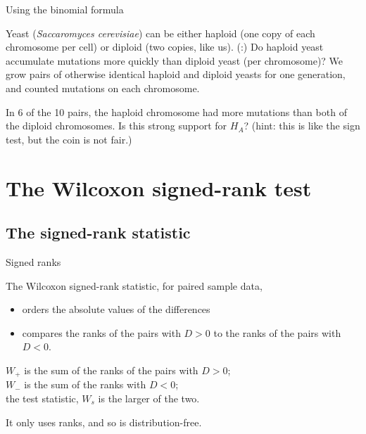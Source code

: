 \begin{frame}{Using the binomial formula}

  Yeast ({\it Saccaromyces cerevisiae}) can be either haploid (one copy of each chromosome per cell) or diploid (two copies, like us).
  (:) Do haploid yeast accumulate mutations more quickly than diploid yeast (per chromosome)?
  We grow pairs of otherwise identical haploid and diploid yeasts for one generation,
  and counted mutations on each chromosome.

    \vspace{2em}

    In 6 of the 10 pairs, the haploid chromosome had more mutations than both of the diploid chromosomes.
    Is this strong support for $H_A$? {\small (\alert{hint:} this is like the sign test, but the coin is not fair.) }


\end{frame}

\section{The Wilcoxon signed-rank test}

\subsection{The signed-rank statistic}

\begin{frame}{Signed ranks}

    The Wilcoxon signed-rank statistic, for paired sample data,
    \begin{itemize}
        \item orders the \alert{absolute values} of the differences
        \item compares the ranks of the pairs with $D>0$ to the ranks of the pairs with $D<0$.
    \end{itemize}

    \vspace{2em}

    $W_+$ is the sum of the ranks of the pairs with $D>0$; \\
    $W_-$ is the sum of the ranks with $D<0$; \\
    the \alert{test statistic}, $W_s$ is the larger of the two.

    \vspace{2em}

    It only uses \alert{ranks},
    and so is distribution-free.

\end{frame}

